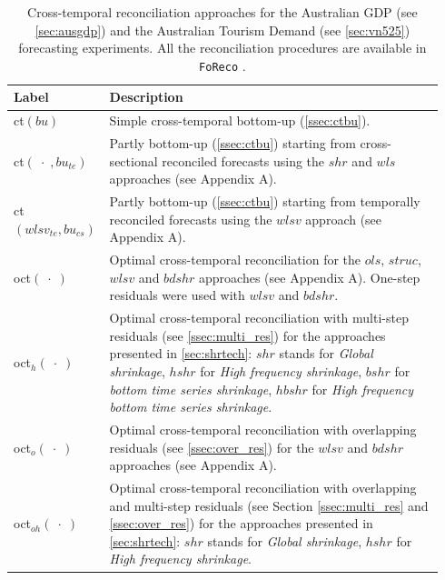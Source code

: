 \documentclass[a4paper,11pt]{article}
\theoremstyle{definition}
\begin{document}
\begin{table}[!t]
	\centering
	\begin{tabular}{M{0.17\linewidth}|L{0.77\linewidth}}
		\toprule
		\textbf{Label} & \textbf{Description} \\
		\midrule
		ct$(bu)$ & Simple cross-temporal bottom-up (\autoref{ssec:ctbu}). \\
		\addlinespace[0.15cm]
		ct$(\;\cdot\;, bu_{te})$ & Partly bottom-up (\autoref{ssec:ctbu}) starting from cross-sectional reconciled forecasts using the $shr$ and $wls$ approaches (see Appendix A).\\
		\addlinespace[0.15cm]
		ct$(wlsv_{te}, bu_{cs})$ & Partly bottom-up (\autoref{ssec:ctbu}) starting from temporally reconciled forecasts using the $wlsv$ approach (see Appendix A).\\
		\addlinespace[0.15cm]
		oct$(\;\cdot\;)$ & Optimal cross-temporal reconciliation for the $ols$, $struc$, $wlsv$ and $bdshr$ approaches (see Appendix A). One-step residuals were used with $wlsv$ and $bdshr$. \\
		\addlinespace[0.15cm]
		oct$_h(\;\cdot\;)$ & Optimal cross-temporal reconciliation with multi-step residuals (see \autoref{ssec:multi_res}) for the approaches presented in \autoref{sec:shrtech}: $shr$ stands for \textit{Global shrinkage}, $hshr$ for \textit{High frequency shrinkage}, $bshr$ for \textit{bottom time series shrinkage}, $hbshr$ for \textit{High frequency bottom time series shrinkage}.\\
		\addlinespace[0.15cm]
		oct$_o(\;\cdot\;)$ & Optimal cross-temporal reconciliation with overlapping residuals (see \autoref{ssec:over_res}) for the $wlsv$ and $bdshr$ approaches (see Appendix A). \\
		\addlinespace[0.15cm]
		oct$_{oh}(\;\cdot\;)$ & Optimal cross-temporal reconciliation with overlapping and multi-step residuals (see Section \ref{ssec:multi_res} and \ref{ssec:over_res}) for the approaches presented in \autoref{sec:shrtech}: $shr$ stands for \textit{Global shrinkage}, $hshr$ for \textit{High frequency shrinkage}.\\
		\bottomrule
	\end{tabular}%
	\caption{Cross-temporal reconciliation approaches for %
	the Australian GDP (see \autoref{sec:ausgdp}) and the Australian Tourism Demand (see \autoref{sec:vn525}) forecasting experiments. All the reconciliation procedures are available in \texttt{FoReco} \citep{foreco2023}.}
	\label{tab:notation}
\end{table}
\end{document}
